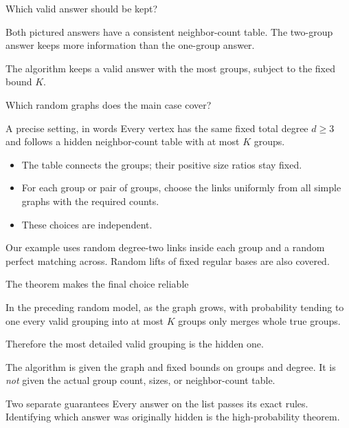 \begin{frame}{Which valid answer should be kept?}
\begin{center}
\end{center}
Both pictured answers have a consistent neighbor-count table.
The two-group answer keeps more information than the one-group answer.

The algorithm keeps a valid answer with the most groups, subject to the fixed bound $K$.
\end{frame}

\begin{frame}{Which random graphs does the main case cover?}
\begin{block}{A precise setting, in words}
Every vertex has the same fixed total degree $d\ge3$ and follows a hidden
neighbor-count table with at most $K$ groups.
\end{block}
\begin{itemize}
\item The table connects the groups; their positive size ratios stay fixed.
\item For each group or pair of groups, choose the links uniformly from
all simple graphs with the required counts.
\item These choices are independent.
\end{itemize}
Our example uses random degree-two links inside each group and a random
perfect matching across. Random lifts of fixed regular bases are also covered.
\end{frame}

\begin{frame}{The theorem makes the final choice reliable}
\begin{theorem}
In the preceding random model, as the graph grows, with probability tending
to one every valid grouping into at most $K$ groups only merges whole true groups.
\end{theorem}
Therefore the most detailed valid grouping is the hidden one.

The algorithm is given the graph and fixed bounds on groups and degree.
It is \emph{not} given the actual group count, sizes, or neighbor-count table.
\begin{block}{Two separate guarantees}
Every answer on the list passes its exact rules.
Identifying which answer was originally hidden is the high-probability theorem.
\end{block}
\end{frame}

